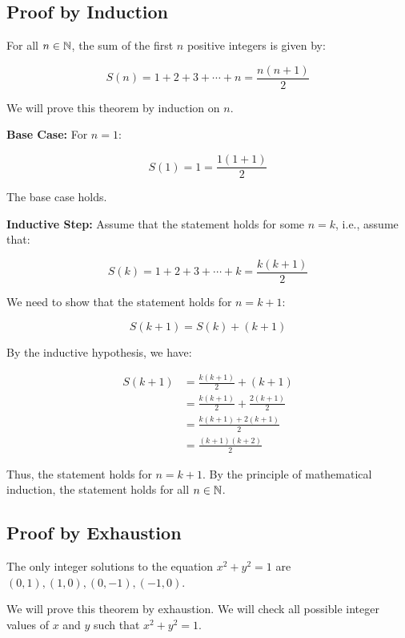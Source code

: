 \QED

\subsection{Proof by Induction}

For all \( n \in \mathbb{N} \), the sum of the first \( n \) positive integers is given by:

\[
	S(n) = 1 + 2 + 3 + \cdots + n = \frac{n(n+1)}{2}
\]

We will prove this theorem by induction on \( n \).
\vspace{\baselineskip}

\textbf{Base Case:} For \( n = 1 \):

\[
	S(1) = 1 = \frac{1(1+1)}{2}
\]

The base case holds.
\vspace{\baselineskip}

\textbf{Inductive Step:} Assume that the statement holds for some \( n = k \), i.e., assume that:
	
\[
	S(k) = 1 + 2 + 3 + \cdots + k = \frac{k(k+1)}{2}
\]
	
We need to show that the statement holds for \( n = k + 1 \):

\[
	S(k+1) = S(k) + (k + 1)
\]
	
By the inductive hypothesis, we have:

\begin{align*}
	S(k+1) &= \frac{k(k+1)}{2} + (k + 1) \\
	&= \frac{k(k+1)}{2} + \frac{2(k + 1)}{2}\\
    &= \frac{k(k+1) + 2(k + 1)}{2} \\
	&= \frac{(k + 1)(k + 2)}{2}	
\end{align*}

Thus, the statement holds for \( n = k + 1 \).
By the principle of mathematical induction, the statement holds for all \( n \in \mathbb{N} \).

\QED

\subsection{Proof by Exhaustion}

The only integer solutions to the equation \( x^2 + y^2 = 1 \) are \( (0, 1), (1, 0), (0, -1), (-1, 0) \).
\vspace{\baselineskip}

We will prove this theorem by exhaustion. We will check all possible integer values of \( x \) and \( y \) such that \( x^2 + y^2 = 1 \).
\vspace{\baselineskip}


